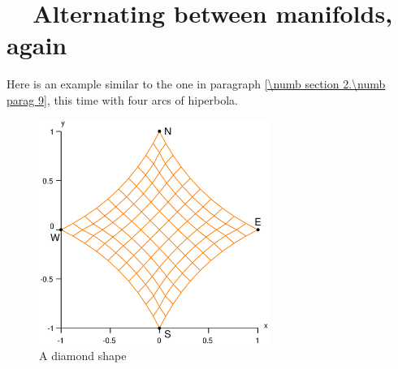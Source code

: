 \section{~~Alternating between manifolds, again}\label{\numb section 2.\numb parag 11}

Here is an example similar to the one in paragraph \ref{\numb section 2.\numb parag 9},
this time with four arcs of hiperbola.

\begin{figure}[ht] \centering
  \includegraphics[width=75mm]{diamond}
  \caption{A diamond shape}
  \label{\numb section 2.\numb fig 11}
\end{figure}


